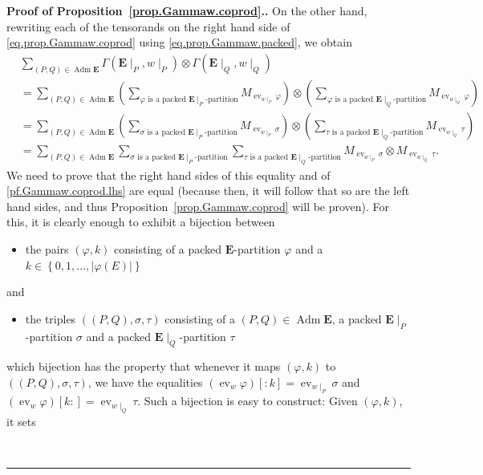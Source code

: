 \documentclass[numbers=enddot,12pt,final,onecolumn,notitlepage,abstracton]{scrartcl}
\theoremstyle{definition}
\newenvironment{proof}[1][Proof]{\noindent\textbf{#1.} }{\ \rule{0.5em}{0.5em}}
\let\sumnonlimits\sum
\renewcommand{\sum}{\sumnonlimits\limits}
\newenvironment{vershort}{}{}
\newcommand{\ev}{\operatorname{ev}}
\newcommand{\Adm}{\operatorname{Adm}}
\newcommand{\EE}{{\mathbf{E}}}
\begin{document}
\begin{vershort}
\begin{proof}[Proof of Proposition~\ref{prop.Gammaw.coprod}.]
On the other hand, rewriting each of the tensorands on the right
hand side of \eqref{eq.prop.Gammaw.coprod} using
\eqref{eq.prop.Gammaw.packed}, we obtain
\begin{align*}
& \sum_{\left(P, Q\right) \in \Adm \EE}
\Gamma\left(\EE\mid_P, w\mid_P\right)
\otimes \Gamma\left(\EE\mid_Q, w\mid_Q\right) \\
&= \sum_{\left(P, Q\right) \in \Adm \EE}
\left(\sum_{\varphi \text{ is a packed } \EE\mid_P\text{-partition}}
M_{\ev_{w\mid_P} \varphi}\right)
\otimes
\left(\sum_{\varphi \text{ is a packed } \EE\mid_Q\text{-partition}}
M_{\ev_{w\mid_Q} \varphi}\right) \\
& = \sum_{\left(P, Q\right) \in \Adm \EE}
\left(\sum_{\sigma \text{ is a packed } \EE\mid_P\text{-partition}}
M_{\ev_{w\mid_P} \sigma}\right)
\otimes
\left(\sum_{\tau \text{ is a packed } \EE\mid_Q\text{-partition}}
M_{\ev_{w\mid_Q} \tau}\right) \\
& = \sum_{\left(P, Q\right) \in \Adm \EE}
\sum_{\sigma \text{ is a packed } \EE\mid_P\text{-partition}}
\sum_{\tau \text{ is a packed } \EE\mid_Q\text{-partition}}
M_{\ev_{w\mid_P} \sigma}
\otimes
M_{\ev_{w\mid_Q} \tau} .
\end{align*}
We need to prove that the right hand sides of this equality and of
\eqref{pf.Gammaw.coprod.lhs} are equal (because then, it will follow
that so are the left hand sides, and thus
Proposition~\ref{prop.Gammaw.coprod} will be proven). For this, it
is clearly enough to exhibit a bijection between
\begin{itemize}
\item the pairs
$\left(\varphi, k\right)$ consisting of a packed $\EE$-partition
$\varphi$ and a
$k \in \left\{0, 1, \ldots, \left|\varphi\left(E\right)\right|
\right\}$
\end{itemize}
and
\begin{itemize}
\item the triples $\left(\left(P, Q\right), \sigma, \tau
\right)$ consisting of a $\left(P, Q\right) \in \Adm \EE$, a packed
$\EE\mid_P$-partition $\sigma$ and a packed $\EE\mid_Q$-partition
$\tau$
\end{itemize}
which bijection has the property that
whenever it maps $\left(\varphi, k\right)$ to
$\left(\left(P, Q\right), \sigma, \tau\right)$,
we have the equalities
$\left(\ev_w \varphi\right)\left[:k\right]
= \ev_{w\mid_P}\sigma$
and
$\left(\ev_w \varphi\right)\left[k:\right]
= \ev_{w\mid_Q}\tau$.
Such a bijection is easy to construct: Given
$\left(\varphi, k\right)$, it sets

\end{proof}
\end{vershort}
\end{document}
